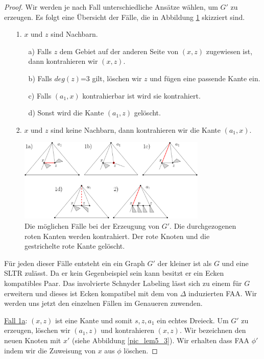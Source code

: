 \begin{proof}
Wir werden je nach Fall unterschiedliche Ansätze wählen, um $G'$ zu erzeugen. Es folgt eine Übersicht der Fälle, die in Abbildung \ref{pic_lem5_2} skizziert sind.

\begin{itemize}
\item [1.] $x$ und $z$ sind Nachbarn.
	\begin{itemize}
	\item [a)] Falls $z$ dem Gebiet auf der anderen Seite von $(x,z)$ zugewiesen ist, dann kontrahieren wir $(x,z)$.
	\item [b)] Falls $deg(z)$=3 gilt, löschen wir $z$ und fügen eine passende Kante ein.
	\item [c)] Falls $(a_1,x)$ kontrahierbar ist wird sie kontrahiert.
	\item [d)] Sonst wird die Kante $(a_1,z)$ gelöscht.
	\end{itemize}
\item [2.] $x$ und $z$ sind keine Nachbarn, dann kontrahieren wir die Kante $(a_1,x)$.
\end{itemize} 

\begin{figure}
	\centering
	  \includegraphics[width=0.8\textwidth]{lem5_2.png}
    	\caption{Die möglichen Fälle bei der Erzeugung von $G'$. Die durchgezogenen roten Kanten werden kontrahiert. Der rote Knoten und die gestrichelte rote Kante gelöscht.}
    	\label{pic_lem5_2}
\end{figure}

Für jeden dieser Fälle entsteht ein ein Graph $G'$ der kleiner ist als $G$ und eine SLTR zulässt. Da er kein Gegenbeispiel sein kann besitzt er ein Ecken kompatibles Paar. Das involvierte Schnyder Labeling lässt sich zu einem für $G$ erweitern und dieses ist Ecken kompatibel mit dem von $\Delta$ induzierten FAA. Wir werden uns jetzt den einzelnen Fällen im Genaueren zuwenden. 

\underline{Fall 1a}: $(x,z)$ ist eine Kante und somit $s,z,a_1$ ein echtes Dreieck. Um $G'$ zu erzeugen, löschen wir $(a_1,z)$ und kontrahieren $(x,z)$. Wir bezeichnen den neuen Knoten mit $x'$ (siehe Abbildung \ref{pic_lem5_3}). Wir erhalten dass FAA $\phi'$ indem wir die Zuweisung von $x$ aus $\phi$ löschen.





\end{proof}
